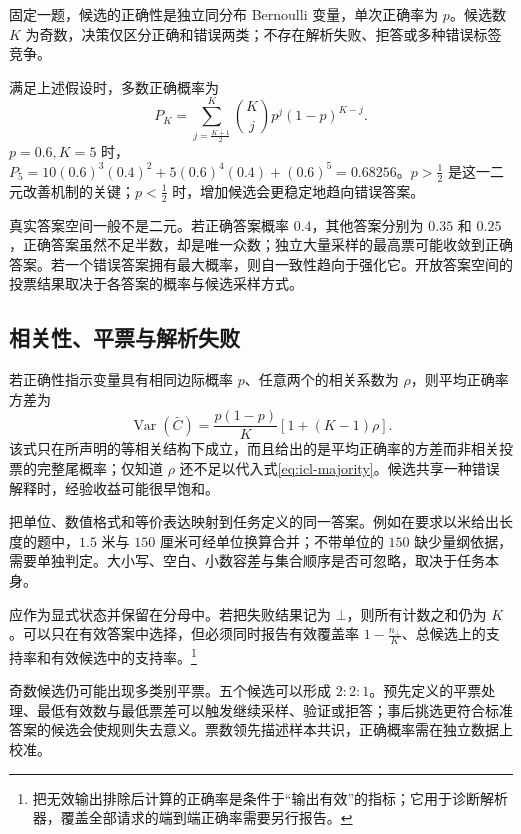 \documentclass[../textbook.tex]{subfiles}
\begin{document}
\begin{assumption}[二元多数正确率]
固定一题，候选的正确性是独立同分布 Bernoulli 变量，单次正确率为 $p$。候选数 $K$ 为奇数，决策仅区分正确和错误两类；不存在解析失败、拒答或多种错误标签竞争。
\end{assumption}

满足上述假设时，多数正确概率为
\begin{equation}
P_K=\sum_{j=\frac{K+1}{2}}^{K}\binom Kj p^j(1-p)^{K-j}.
\label{eq:icl-majority}
\end{equation}
$p=0.6,K=5$ 时，$P_5=10(0.6)^3(0.4)^2+5(0.6)^4(0.4)+(0.6)^5=0.68256$。$p>\frac{1}{2}$ 是这一二元改善机制的关键；$p<\frac{1}{2}$ 时，增加候选会更稳定地趋向错误答案。

真实答案空间一般不是二元。若正确答案概率 $0.4$，其他答案分别为 $0.35$ 和 $0.25$，正确答案虽然不足半数，却是唯一众数；独立大量采样的最高票可能收敛到正确答案。若一个错误答案拥有最大概率，则自一致性趋向于强化它。开放答案空间的投票结果取决于各答案的概率与候选采样方式。

\subsection{相关性、平票与解析失败}
若正确性指示变量具有相同边际概率 $p$、任意两个的相关系数为 $\rho$，则平均正确率方差为
\begin{equation}
\operatorname{Var}(\bar C)=\frac{p(1-p)}K[1+(K-1)\rho].
\end{equation}
该式只在所声明的等相关结构下成立，而且给出的是平均正确率的方差而非相关投票的完整尾概率；仅知道 $\rho$ 还不足以代入式\eqref{eq:icl-majority}。候选共享一种错误解释时，经验收益可能很早饱和。

把单位、数值格式和等价表达映射到任务定义的同一答案。例如在要求以米给出长度的题中，$1.5$ 米与 $150$ 厘米可经单位换算合并；不带单位的 $150$ 缺少量纲依据，需要单独判定。大小写、空白、小数容差与集合顺序是否可忽略，取决于任务本身。

应作为显式状态并保留在分母中。若把失败结果记为 $\bot$，则所有计数之和仍为 $K$。可以只在有效答案中选择，但必须同时报告有效覆盖率 $1-\frac{n_\bot}{K}$、总候选上的支持率和有效候选中的支持率。\footnote{把无效输出排除后计算的正确率是条件于“输出有效”的指标；它用于诊断解析器，覆盖全部请求的端到端正确率需要另行报告。}

奇数候选仍可能出现多类别平票。五个候选可以形成 $2:2:1$。预先定义的平票处理、最低有效数与最低票差可以触发继续采样、验证或拒答；事后挑选更符合标准答案的候选会使规则失去意义。票数领先描述样本共识，正确概率需在独立数据上校准。
\end{document}

